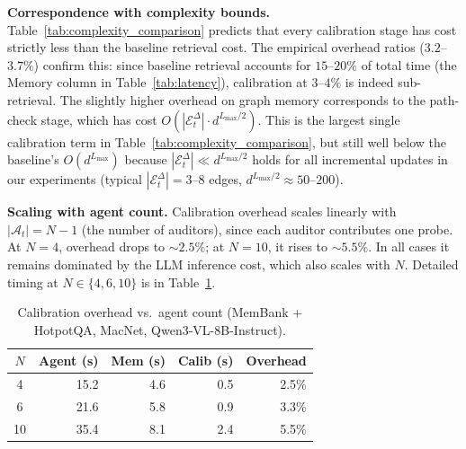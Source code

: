 \textbf{Correspondence with complexity bounds.}
Table~\ref{tab:complexity_comparison} predicts that
every calibration stage has cost strictly less than
the baseline retrieval cost.  The empirical overhead
ratios ($3.2$--$3.7\%$) confirm this: since baseline
retrieval accounts for $15$--$20\%$ of total time
(the Memory column in Table~\ref{tab:latency}),
calibration at $3$--$4\%$ is indeed sub-retrieval.
The slightly higher overhead on graph memory
corresponds to the path-check stage, which has cost
$O(|\mathcal{E}_t^\Delta| \cdot d^{L_{\max}/2})$.
This is the largest single calibration term in
Table~\ref{tab:complexity_comparison}, but still
well below the baseline's $O(d^{L_{\max}})$ because
$|\mathcal{E}_t^\Delta| \ll d^{L_{\max}/2}$ holds
for all incremental updates in our experiments
(typical $|\mathcal{E}_t^\Delta| = 3$--$8$ edges,
$d^{L_{\max}/2} \approx 50$--$200$).

\textbf{Scaling with agent count.}
Calibration overhead scales linearly with
$|\mathcal{A}_t| = N - 1$ (the number of auditors),
since each auditor contributes one probe.  At $N=4$,
overhead drops to ${\sim}2.5\%$; at $N=10$, it rises
to ${\sim}5.5\%$.  In all cases it remains dominated
by the LLM inference cost, which also scales with
$N$.  Detailed timing at $N \in \{4, 6, 10\}$ is
in Table~\ref{tab:latency_scaling}.

\begin{table}[h]
\centering
\caption{Calibration overhead vs.\ agent count
  (MemBank + HotpotQA, MacNet, Qwen3-VL-8B-Instruct).}
\label{tab:latency_scaling}
\small
\begin{tabular}{c|rrr|r}
\toprule
$N$ & \textbf{Agent (s)} & \textbf{Mem (s)}
    & \textbf{Calib (s)} & \textbf{Overhead} \\
\midrule
4  & 15.2 & 4.6 & 0.5 & 2.5\% \\
6  & 21.6 & 5.8 & 0.9 & 3.3\% \\
10 & 35.4 & 8.1 & 2.4 & 5.5\% \\
\bottomrule
\end{tabular}
\end{table}
